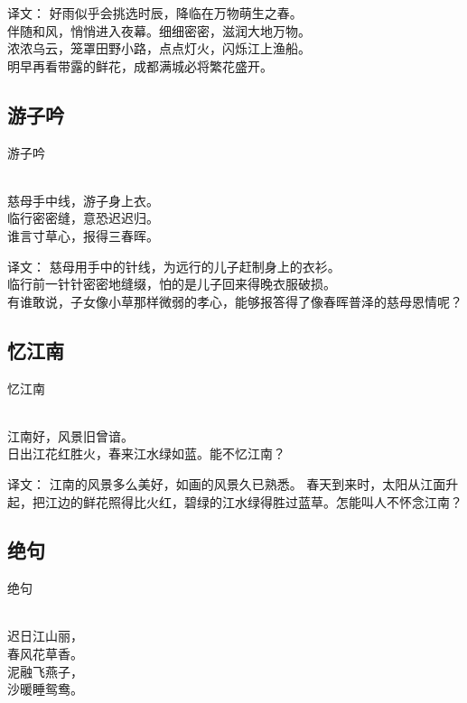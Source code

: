 译文：
好雨似乎会挑选时辰，降临在万物萌生之春。\\
伴随和风，悄悄进入夜幕。细细密密，滋润大地万物。\\
浓浓乌云，笼罩田野小路，点点灯火，闪烁江上渔船。\\
明早再看带露的鲜花，成都满城必将繁花盛开。

\subsection{游子吟}

\noindent 游子吟

  \\

\noindent 慈母手中线，游子身上衣。\\
临行密密缝，意恐迟迟归。\\
谁言寸草心，报得三春晖。

译文：
慈母用手中的针线，为远行的儿子赶制身上的衣衫。\\
临行前一针针密密地缝缀，怕的是儿子回来得晚衣服破损。\\
有谁敢说，子女像小草那样微弱的孝心，能够报答得了像春晖普泽的慈母恩情呢？

\subsection{忆江南}

\noindent 忆江南

  \\

\noindent 江南好，风景旧曾谙。\\
日出江花红胜火，春来江水绿如蓝。能不忆江南？

译文：
江南的风景多么美好，如画的风景久已熟悉。
春天到来时，太阳从江面升起，把江边的鲜花照得比火红，碧绿的江水绿得胜过蓝草。怎能叫人不怀念江南？

\subsection{绝句}

\noindent 绝句

  \\

\noindent 迟日江山丽，\\春风花草香。\\
泥融飞燕子，\\沙暖睡鸳鸯。

